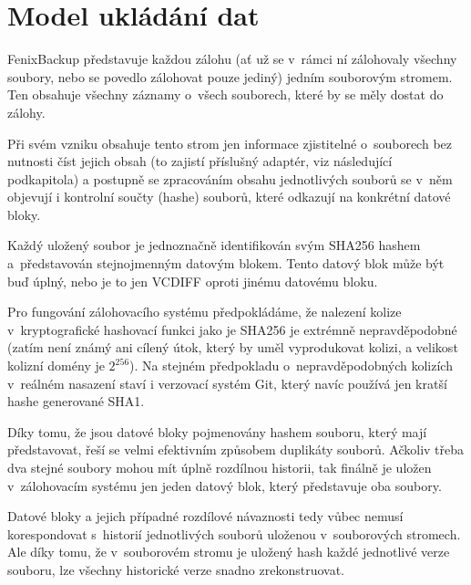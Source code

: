 \section{Model ukládání dat}

FenixBackup představuje každou zálohu (ať už se v~rámci ní zálohovaly všechny
soubory, nebo se povedlo zálohovat pouze jediný) jedním souborovým stromem. Ten
obsahuje všechny záznamy o~všech souborech, které by se měly dostat do zálohy.

Při svém vzniku obsahuje tento strom jen informace zjistitelné o~souborech bez
nutnosti číst jejich obsah (to zajistí příslušný adaptér, viz následující
podkapitola) a postupně se zpracováním obsahu jednotlivých souborů se v~něm
objevují i kontrolní součty (hashe) souborů, které odkazují na konkrétní datové
bloky.


Každý uložený soubor je jednoznačně identifikován svým \gls{SHA256} hashem
a~představován stejnojmenným datovým blokem. Tento datový blok může být buď
úplný, nebo je to jen \gls{VCDIFF} oproti jinému datovému bloku.

Pro fungování zálohovacího systému předpokládáme, že nalezení kolize
v~kryptografické hashovací funkci jako je \gls{SHA256} je extrémně
nepravděpodobné (zatím není známý ani cílený útok, který by uměl vyprodukovat
kolizi, a velikost kolizní domény je $2^{256}$). Na stejném předpokladu
o~nepravděpodobných kolizích v~reálném nasazení staví i verzovací systém Git,
který navíc používá jen kratší hashe generované \gls{SHA1}.

Díky tomu, že jsou datové bloky pojmenovány hashem souboru, který mají
představovat, řeší se velmi efektivním způsobem duplikáty souborů. Ačkoliv třeba
dva stejné soubory mohou mít úplně rozdílnou historii, tak finálně je uložen
v~zálohovacím systému jen jeden datový blok, který představuje oba soubory.

Datové bloky a jejich případné rozdílové návaznosti tedy vůbec nemusí
korespondovat s~historií jednotlivých souborů uloženou v~souborových stromech.
Ale díky tomu, že v~souborovém stromu je uložený hash každé jednotlivé verze
souboru, lze všechny historické verze snadno zrekonstruovat.

